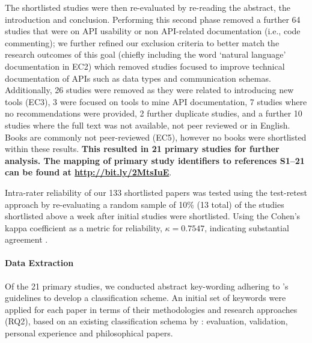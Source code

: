 The shortlisted studies were then re-evaluated by re-reading the abstract, the introduction and conclusion. Performing this second phase removed a further 64 studies that were on API usability or non API-related  documentation (i.e., code commenting); we further refined our exclusion criteria to better match the research outcomes of this goal (chiefly including the word `natural language' documentation in EC2) which removed studies focused to improve technical documentation of APIs such as data types and communication schemas. Additionally, 26 studies were removed as they were related to introducing new tools (EC3), 3 were focused on tools to mine API documentation, 7 studies where no recommendations were provided, 2 further duplicate studies, and a further 10 studies where the full text was not available, not peer reviewed or in English. Books are commonly not peer-reviewed (EC5), however no books were shortlisted within these results. \textbf{This resulted in 21 primary studies for further analysis. The mapping of primary study identifiers to references S1--21 can be found at \url{http://bit.ly/2MtsIuE}}.

Intra-rater reliability of our 133 shortlisted papers was tested using the test-retest approach \citep{Kitchenham:2007dd} by re-evaluating a random sample of 10\% (13 total) of the studies shortlisted above a week after initial studies were shortlisted. Using the Cohen's kappa coefficient as a metric for reliability, $\kappa=0.7547$, indicating substantial agreement \citep{Landis:1977kv}.

\paragraph{Data Extraction}
\label{esem2019:sec:data-extraction}

Of the 21 primary studies, we conducted abstract key-wording adhering to \citeauthor{Petersen:2008td}'s guidelines \citep{Petersen:2008td} to develop a classification scheme.
An initial set of keywords were applied for each paper in terms of their methodologies and research approaches (RQ2), based on an existing classification schema by \citet{Wieringa:2006vd}: evaluation, validation, personal experience and philosophical papers.

